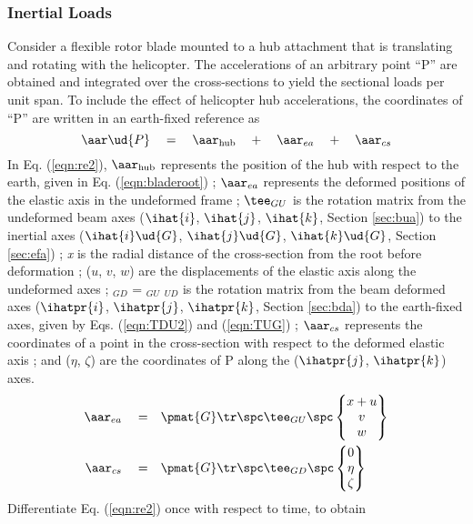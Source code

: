 \subsubsection{Inertial Loads}
\label{sec:inrloads}
Consider a flexible rotor blade mounted to a hub attachment that is translating and rotating with the helicopter. The accelerations of an arbitrary point ``P'' are obtained and integrated over the cross-sections to yield the sectional loads per unit span. To include the effect of helicopter hub accelerations, the coordinates of ``P'' are written in an earth-fixed reference as
\begin{equation}
\label{eqn:re2}
\aar\ud{P} \quad = \quad \aar_\textrm{hub} \quad + \quad \aar_{ea} \quad + \quad \aar_{cs} 
\end{equation}
In Eq. (\ref{eqn:re2}), $\aar_\textrm{hub}$ represents the position of the hub with respect to the earth, given in Eq. (\ref{eqn:bladeroot}) ; $\aar_{ea}$ represents the deformed positions of the elastic axis in the undeformed frame ; $\tee_{GU}$ is the rotation matrix from the undeformed beam axes ($\ihat{i}$, $\ihat{j}$, $\ihat{k}$, Section \ref{sec:bua}) to the inertial axes ($\ihat{i}\ud{G}$, $\ihat{j}\ud{G}$, $\ihat{k}\ud{G}$, Section \ref{sec:efa}) ; \emph{x} is the radial distance of the cross-section from the root before deformation ; ($u$, $v$, $w$) are the displacements of the elastic axis along the undeformed axes ; \tee$_{GD}$ = \tee$_{GU}$ \tee$_{UD}$ is the rotation matrix from the beam deformed axes ($\ihatpr{i}$, $\ihatpr{j}$, $\ihatpr{k}$, Section \ref{sec:bda}) to the earth-fixed axes, given by Eqs. (\ref{eqn:TDU2}) and (\ref{eqn:TUG}) ; $\aar_{cs}$ represents the coordinates of a point in the cross-section with respect to the deformed elastic axis ; and ($\eta$, $\zeta$) are the coordinates of P along the ($\ihatpr{j}$, $\ihatpr{k}$) axes. 
\begin{align*}
\aar_{ea} \quad = \quad & \pmat{G}\tr \spc \tee_{GU} \spc 
\begin{Bmatrix} x+u \\ v \\ w \end{Bmatrix} \\
\aar_{cs} \quad = \quad & \pmat{G}\tr \spc \tee_{GD} \spc \begin{Bmatrix} 0 \\ \eta \\ \zeta \end{Bmatrix} 
\end{align*}
Differentiate Eq. (\ref{eqn:re2}) once with respect to time, to obtain
